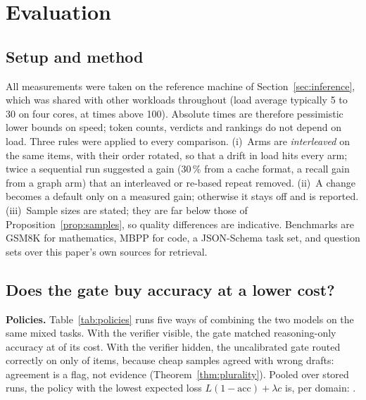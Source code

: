\section{Evaluation}
\label{sec:eval}

\subsection{Setup and method}
\label{sec:eval:setup}
All measurements were taken on the reference machine of
Section~\ref{sec:inference}, which was shared with other workloads throughout
(load average typically 5 to 30 on four cores, at times above 100). Absolute
times are therefore pessimistic lower bounds on speed; token counts, verdicts
and rankings do not depend on load. Three rules were applied to every
comparison. (i)~Arms are \emph{interleaved} on the same items, with their
order rotated, so that a drift in load hits every arm; twice a sequential run
suggested a gain (30\,\% from a cache format, a recall gain from a graph arm)
that an interleaved or re-based repeat removed. (ii)~A change becomes a
default only on a measured gain; otherwise it stays off and is reported.
(iii)~Sample sizes are stated; they are far below those of
Proposition~\ref{prop:samples}, so quality differences are indicative.
Benchmarks are GSM8K \cite{cobbe2021gsm8k} for mathematics, MBPP \cite{austin2021mbpp} for code, a JSON-Schema task set, and
question sets over this paper's own sources for retrieval.

\subsection{Does the gate buy accuracy at a lower cost?}
\label{sec:eval:gate}
\textbf{Policies.} Table~\ref{tab:policies} runs five ways of combining the
two models on the same mixed tasks. With the verifier visible, the gate
matched reasoning-only accuracy at \GatedCostRatio{} of its cost. With the
verifier hidden, the uncalibrated gate routed correctly on only
\BlindRouting{} of items, because cheap samples agreed with wrong drafts:
agreement is a flag, not evidence (Theorem~\ref{thm:plurality}). Pooled over
\PolicyMapRuns{} stored runs, the policy with the lowest expected loss
$L(1-\mathrm{acc})+\lambda c$ is, per domain: \PolicyMapSummary.

\begin{table}[t]
\centering\caption{Policies on a mixed task set ($n=6$ per policy; indicative)}\label{tab:policies}
\resizebox{\columnwidth}{!}{\PhaseTwoTable}
\end{table}

